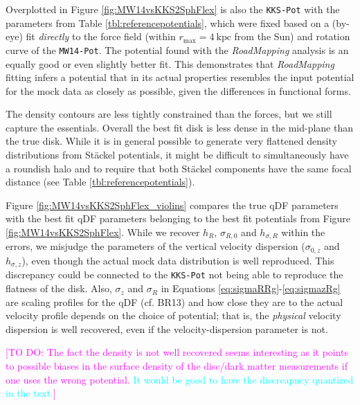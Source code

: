 \documentclass[iop,revtex4]{emulateapj}
\newcommand{\RM}{{\sl RoadMapping}}
\newcommand{\HW}[1]{\textcolor{Cyan}{#1}}
\newcommand{\Wilma}[1]{\textcolor{Magenta}{#1}}
\begin{document}
Overplotted in Figure \ref{fig:MW14vsKKS2SphFlex} is also the \texttt{KKS-Pot} with the parameters from Table \ref{tbl:referencepotentials}, which were fixed based on a (by-eye) fit \emph{directly} to the force field (within $r_\text{max}=4~\text{kpc}$ from the Sun) and rotation curve of the \texttt{MW14-Pot}. The potential found with the \RM{} analysis is an equally good or even slightly better fit. This demonstrates that \RM{} fitting infers a potential that in its actual properties resembles the input potential for the mock data as closely as possible, given the differences in functional forms.

The density contours are less tightly constrained than the forces, but we still capture the essentials. Overall the best fit disk is less dense in the mid-plane than the true disk. While it is in general possible to generate very flattened density distributions from St\"{a}ckel potentials, it might be difficult to simultaneously have a roundish halo and to require that both St\"{a}ckel components have the same focal distance (see Table \ref{tbl:referencepotentials}).

Figure \ref{fig:MW14vsKKS2SphFlex_violins} compares the true qDF parameters with the best fit qDF parameters belonging to the best fit potentials from Figure \ref{fig:MW14vsKKS2SphFlex}. While we recover $h_R$, $\sigma_{R,0}$ and $h_{\sigma,R}$ within the errors, we misjudge the parameters of the vertical velocity dispersion ($\sigma_{0,z}$ and $h_{\sigma,z}$), even though the actual mock data distribution is well reproduced. This discrepancy could be connected to the \texttt{KKS-Pot} not being able to reproduce the flatness of the disk. Also, $\sigma_z$ and $\sigma_R$ in Equations \eqref{eq:sigmaRRg}-\eqref{eq:sigmazRg} are scaling profiles for the qDF (cf. BR13) and how close they are to the actual velocity profile depends on the choice of potential; that is, the \emph{physical} velocity dispersion is well recovered, even if the velocity-dispersion parameter is not.

\Wilma{[TO DO: The fact the density is not well recovered seems interesting as it points to possible biases in the surface density of the disc/dark matter measurements if one uses the wrong potential. \HW{It would be good to have the discreapncy quantized in the text.}]}

\end{document}
